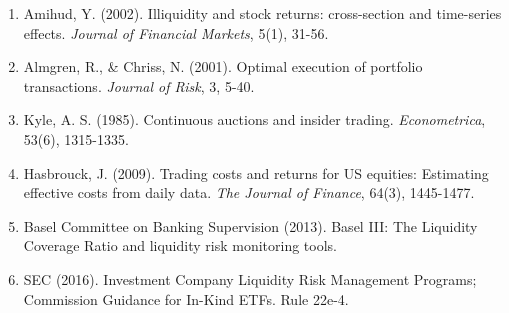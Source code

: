 \documentclass[11pt,a4paper]{article}
\begin{document}
\begin{enumerate}
    \item Amihud, Y. (2002). Illiquidity and stock returns: cross-section and time-series effects. \textit{Journal of Financial Markets}, 5(1), 31-56.

    \item Almgren, R., \& Chriss, N. (2001). Optimal execution of portfolio transactions. \textit{Journal of Risk}, 3, 5-40.

    \item Kyle, A. S. (1985). Continuous auctions and insider trading. \textit{Econometrica}, 53(6), 1315-1335.

    \item Hasbrouck, J. (2009). Trading costs and returns for US equities: Estimating effective costs from daily data. \textit{The Journal of Finance}, 64(3), 1445-1477.

    \item Basel Committee on Banking Supervision (2013). Basel III: The Liquidity Coverage Ratio and liquidity risk monitoring tools.

    \item SEC (2016). Investment Company Liquidity Risk Management Programs; Commission Guidance for In-Kind ETFs. Rule 22e-4.
\end{enumerate}
\end{document}
